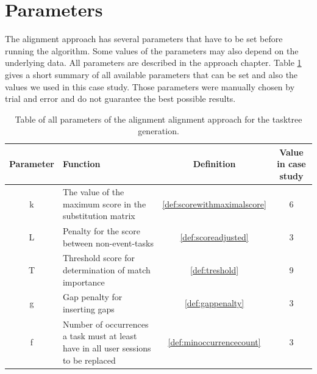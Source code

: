 \section{Parameters}
The alignment approach has several parameters that have to be set before running the algorithm. Some values of the parameters may also depend on the underlying data.
All parameters are described in the approach chapter. Table \ref{tab:parameters} gives a short summary of all available parameters that can be set and also the values
we used in this case study. Those parameters were manually chosen by trial and error and do not guarantee the best possible results.

\begin{table}
	\begin{tabularx}{\textwidth}{|c|X|c|c|}
	   \hline
	   \textbf{Parameter} & \textbf{Function} & \textbf{Definition} & \textbf{Value in case study}\\
	     \hline
	       k & The value of the maximum score in the substitution matrix& \ref{def:scorewithmaximalscore}& 6 \\
	       L & Penalty for the score between non-event-tasks & \ref{def:scoreadjusted} & 3\\
	       T & Threshold score for determination of match importance & \ref{def:treshold} &9\\
	       g & Gap penalty for inserting gaps & \ref{def:gappenalty} &3\\
	       f & Number of occurrences a task must at least have in all user sessions to be replaced & \ref{def:minoccurrencecount} &3\\
	       \hline
 \end{tabularx}
 \caption{Table of all parameters of the alignment alignment approach for the tasktree generation.}
 \label{tab:parameters}
 \end{table}


